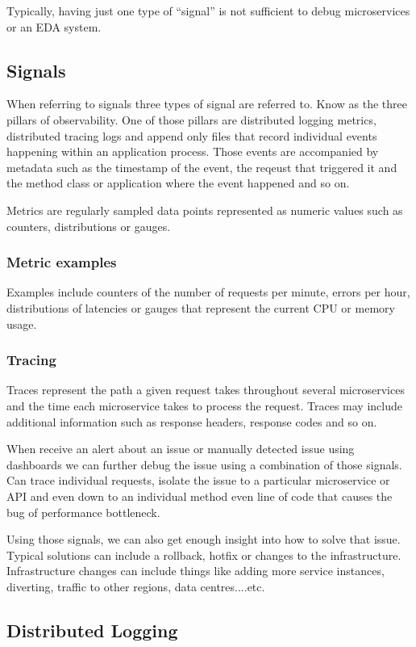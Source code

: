Typically, having just one type of ``signal'' is not sufficient to debug microservices or an EDA system.

\subsection{Signals}
When referring to signals three types of signal are referred to.
Know as the three pillars of observability.
One of those pillars are distributed logging metrics, distributed tracing logs and append only files that record individual events happening within an application process.
Those events are accompanied by metadata such as the timestamp of the event, the reqeust that triggered it and the method class or application where the event happened and so on.

Metrics are regularly sampled data points represented as numeric values such as counters, distributions or gauges.

\subsubsection{Metric examples}
Examples include counters of the number of requests per minute, errors per hour, distributions of latencies or gauges that represent the current CPU or memory usage.

\subsubsection{Tracing}
Traces represent the path a given request takes throughout several microservices and the time each microservice takes to process the request.
Traces may include additional information such as response headers, response codes and so on.

When receive an alert about an issue or manually detected issue using dashboards we can further debug the issue using a combination of those signals.
Can trace individual requests, isolate the issue to a particular microservice or API and even down to an individual method even line of code that causes the bug of performance bottleneck.

Using those signals, we can also get enough insight into how to solve that issue.
Typical solutions can include a rollback, hotfix or changes to the infrastructure.
Infrastructure changes can include things like adding more service instances, diverting, traffic to other regions, data centres....etc.

\subsection{Distributed Logging}

